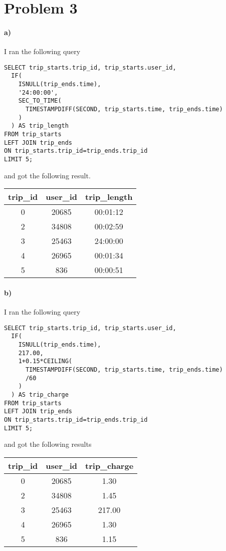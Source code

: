\documentclass[12pt]{article}
\begin{document}
\section*{Problem 3}

\paragraph{a)}

I ran the following query
\begin{verbatim}
SELECT trip_starts.trip_id, trip_starts.user_id,
  IF(
    ISNULL(trip_ends.time),
    '24:00:00',
    SEC_TO_TIME(
      TIMESTAMPDIFF(SECOND, trip_starts.time, trip_ends.time)
    )
  ) AS trip_length
FROM trip_starts
LEFT JOIN trip_ends
ON trip_starts.trip_id=trip_ends.trip_id
LIMIT 5;
\end{verbatim}
and got the following result.
\begin{center}
        \begin{tabular}{c|c|c}
                trip\_id & user\_id & trip\_length\\
                \hline
                0 & 20685 & 00:01:12\\
                2 & 34808 & 00:02:59\\
                3 & 25463 & 24:00:00\\
                4 & 26965 & 00:01:34\\
                5 & 836 & 00:00:51
        \end{tabular}
\end{center}

\paragraph{b)}

I ran the following query
\begin{verbatim}
SELECT trip_starts.trip_id, trip_starts.user_id,
  IF(
    ISNULL(trip_ends.time),
    217.00,
    1+0.15*CEILING(
      TIMESTAMPDIFF(SECOND, trip_starts.time, trip_ends.time)
      /60
    )
  ) AS trip_charge
FROM trip_starts
LEFT JOIN trip_ends
ON trip_starts.trip_id=trip_ends.trip_id
LIMIT 5;
\end{verbatim}
and got the following results
\begin{center}
        \begin{tabular}{c|c|c}
                trip\_id & user\_id & trip\_charge\\
                \hline
                0 & 20685 & 1.30\\
                2 & 34808 & 1.45\\
                3 & 25463 & 217.00\\
                4 & 26965 & 1.30\\
                5 & 836 & 1.15
        \end{tabular}
\end{center}
\end{document}
